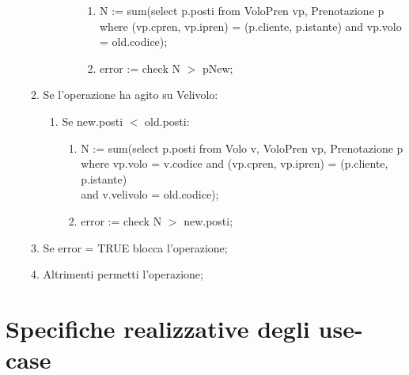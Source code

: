 \documentclass[a4paper,12pt]{report}
\begin{document}
\begin{itemize}
\begin{enumerate}[label*=\arabic*.]
\begin{enumerate}[label*=\arabic*.]
\begin{enumerate}[label*=\arabic*.]
                        \begin{enumerate}[label*=\arabic*.]
                          \item N := sum(select p.posti from VoloPren vp, Prenotazione p where (vp.cpren, vp.ipren) = (p.cliente, p.istante) and vp.volo = old.codice);
                          \item error := check N $>$ pNew;
                        \end{enumerate}
                    \end{enumerate}
                \end{enumerate}
              \item Se l'operazione ha agito su Velivolo:
                \begin{enumerate}[label*=\arabic*.]
                  \item Se new.posti $<$ old.posti:
                        \begin{enumerate}[label*=\arabic*.]
                          \item N := sum(select p.posti from Volo v, VoloPren vp, Prenotazione p \\
                            \hspace*{1cm}where vp.volo = v.codice and (vp.cpren, vp.ipren) = (p.cliente, p.istante) \\
                            \hspace*{1cm}and v.velivolo = old.codice);
                          \item error := check N $>$ new.posti;
                        \end{enumerate}
                \end{enumerate}
              \item Se error = TRUE blocca l'operazione;
              \item Altrimenti permetti l'operazione;
            \end{enumerate}
        \end{itemize}

    \chapter{Specifiche realizzative degli use-case}
\end{document}
